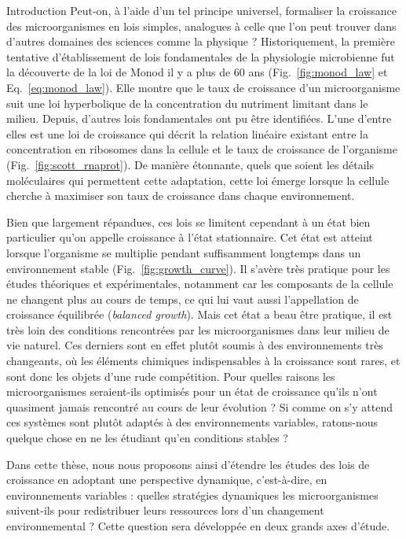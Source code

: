 \begin{chapter_summary}{Introduction}
Peut-on, à l'aide d'un tel principe universel, formaliser la croissance des microorganismes en lois simples, analogues à celle que l'on peut trouver dans d'autres domaines des sciences comme la physique ?
Historiquement, la première tentative d'établissement de lois fondamentales de la physiologie microbienne  fut la découverte de la loi de Monod il y a plus de 60 ans (Fig.~\ref{fig:monod_law} et Eq.~\ref{eq:monod_law}).
Elle montre que le taux de croissance d'un microorganisme suit une loi hyperbolique de la concentration du nutriment limitant dans le milieu.
Depuis, d'autres lois fondamentales ont pu être identifiées.
L'une d'entre elles est une loi de croissance qui décrit la relation linéaire existant entre la concentration en ribosomes dans la cellule et le taux de croissance de l'organisme (Fig.~\ref{fig:scott_rnaprot}).
De manière étonnante, quels que soient les détails moléculaires qui permettent cette adaptation, cette loi émerge lorsque la cellule cherche à maximiser son taux de croissance dans chaque environnement.

Bien que largement répandues, ces lois se limitent cependant à un état bien particulier qu'on appelle croissance à l'état stationnaire.
Cet état est atteint lorsque l'organisme se multiplie pendant suffisamment longtemps dans un environnement stable (Fig.~\ref{fig:growth_curve}).
Il s'avère très pratique pour les études théoriques et expérimentales, notamment car les composants de la cellule ne changent plus au cours de temps, ce qui lui vaut aussi l'appellation de croissance équilibrée (\textit{balanced growth}).
Mais cet état a beau être pratique, il est très loin des conditions rencontrées par les microorganismes dans leur milieu de vie naturel.
Ces derniers sont en effet plutôt soumis à des environnements très changeants, où les éléments chimiques indispensables à la croissance sont rares, et sont donc les objets d'une rude compétition.
Pour quelles raisons les microorganismes seraient-ils optimisés pour un état de croissance qu'ils n'ont quasiment jamais rencontré au cours de leur évolution ?
Si comme on s'y attend ces systèmes sont plutôt adaptés à des environnements variables, ratons-nous quelque chose en ne les étudiant qu'en conditions stables ?

Dans cette thèse, nous nous proposons ainsi d'étendre les études des lois de croissance en adoptant une perspective dynamique, c'est-à-dire, en environnements variables : quelles stratégies dynamiques les microorganismes suivent-ils pour redistribuer leurs ressources lors d'un changement environnemental ?
Cette question sera développée en deux grands axes d'étude.


\end{chapter_summary}
